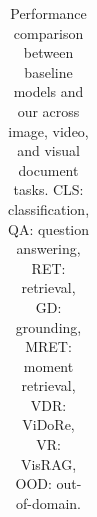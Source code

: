 \begin{table}[ht]
{\begin{tabular}{l ccccc ccccc ccccc c}

\bottomrule
\end{tabular}
}
\caption{Performance comparison between baseline models and our {\model} across image, video, and visual document tasks. CLS: classification, QA: question answering, RET: retrieval, GD: grounding, MRET: moment retrieval, VDR: ViDoRe, VR: VisRAG, OOD: out-of-domain.}
\vspace{-3px}
\label{tab:main_exp}
\end{table}